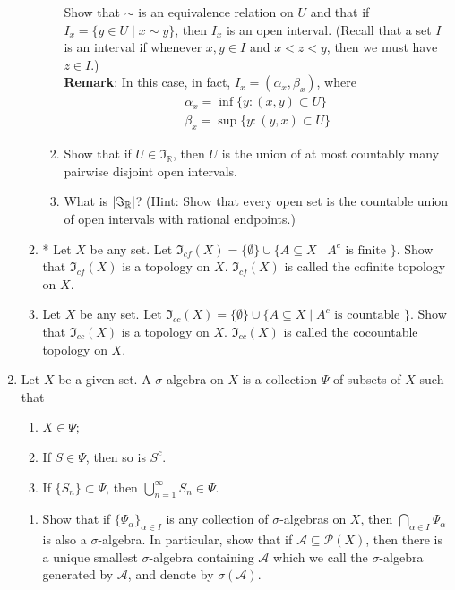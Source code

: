 \documentclass[notoc,notitlepage]{tufte-book}
\begin{document}
\begin{enumerate}
\begin{enumerate}
\begin{enumerate}
            Show that $\sim$ is an equivalence relation on $U$ and that if $I_x = \{ y \in U \mid x \sim y \}$, then $I_x$ is an open interval. (Recall that a set $I$ is an interval if whenever $x, y \in I$ and $x < z < y$, then we must have $z \in I$.) \\
            \textbf{Remark}: In this case, in fact, $I_x = (\alpha_x, \beta_x)$, where
            \begin{gather*}
              \alpha_x = \inf \{ y : (x, y) \subset U \} \\
              \beta_x = \sup \{ y : (y, x) \subset U \}
            \end{gather*}
          \item Show that if $U \in \Im_{\mathbb{R}}$, then $U$ is the union of at most countably many pairwise disjoint open intervals.
          \item What is $\left| \Im_{\mathbb{R}} \right|$? (Hint: Show that every open set is the countable union of open intervals with rational endpoints.)
        \end{enumerate}

      \item * Let $X$ be any set. Let $\Im_{cf}(X) = \{ \emptyset \} \cup \{ A \subseteq X \mid A^c \text{ is finite } \}$. Show that $\Im_{cf}(X)$ is a topology on $X$. $\Im_{cf}(X)$ is called the cofinite topology on $X$.
      \item Let $X$ be any set. Let $\Im_{cc}(X) = \{ \emptyset \} \cup \{ A \subseteq X \mid A^c \text{ is countable } \}$. Show that $\Im_{cc}(X)$ is a topology on $X$. $\Im_{cc}(X)$ is called the cocountable topology on $X$.
    \end{enumerate}

  \item Let $X$ be a given set. A $\sigma$-algebra on $X$ is a collection $\Psi$ of subsets of $X$ such that
    \begin{enumerate}[label=(\roman*)]
      \item $X \in \Psi$;
      \item If $S \in \Psi$, then so is $S^c$.
      \item If $\{ S_n \} \subset \Psi$, then $\bigcup\limits_{n = 1}^{\infty} S_n \in \Psi$.
    \end{enumerate}
    \begin{enumerate}
      \item Show that if $\{ \Psi_\alpha \}_{\alpha \in I}$ is any collection of $\sigma$-algebras on $X$, then $\bigcap\limits_{\alpha \in I} \Psi_{\alpha}$ is also a $\sigma$-algebra. In particular, show that if $\mathcal{A} \subseteq \mathcal{P}(X)$, then there is a unique smallest $\sigma$-algebra containing $\mathcal{A}$ which we call the $\sigma$-algebra generated by $\mathcal{A}$, and denote by $\sigma(\mathcal{A})$.


\end{enumerate}
\end{enumerate}
\end{document}
